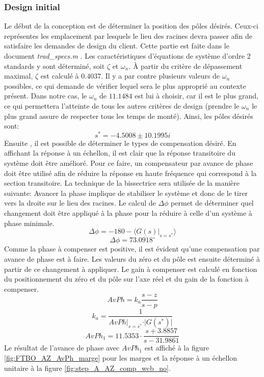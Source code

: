 \documentclass{udes_rapport} %
\begin{document}
\subsubsection{Design initial}
Le début de la conception est de déterminer la position des pôles désirés. Ceux-ci représentes les emplacement par lesquels le lieu des racines devra passer afin de satisfaire les demandes de design du client. Cette partie est faite dans le document \textit{trad\_specs.m} . Les caractéristiques d'équations de système d'ordre 2 standards y sont déterminé, soit $\zeta$ et $\omega _{n}$. À partir du critère de dépassement maximal, $\zeta$ est calculé à $0.4037$. Il y a par contre plusieurs valeurs de $\omega _{n}$ possibles, ce qui demande de vérifier lequel sera le plus approprié au contexte présent. Dans notre cas, le $\omega _{n}$ de $11.1484$ est lui à choisir, car il est le plus grand, ce qui permettera l'atteinte de tous les autres critères de design (prendre le $\omega _{n}$ le plus grand assure de respecter tous les temps de monté). Ainsi, les pôles désirés sont:
\[s^* = -4.5008\pm 10.1995i\]
Ensuite , il est possible de déterminer le types de compensation désiré. En affichant la réponse à un échellon, il est clair que la réponse transitoire du système doit être amélioré. Pour ce faire, un compensateur par avance de phase doit être utilisé afin de réduire la réponse en haute fréquence qui correspond à la section transitoire. La technique de la bissectrice sera utilisée de la manière suivante:
Avancer la phase implique de stabiliser le système et donc de le tirer vers la droite sur le lieu des racines. Le calcul de $\Delta \phi$ permet de déterminer quel changement doit être appliqué à la phase pour la réduire à celle d'un système à phase minimale.
\[\Delta \phi = -180 - \langle G(s)\vert_{s = s^*} \rangle\]
\[\Delta \phi = 73.0918^\circ \]
Comme la phase à compenser est positive, il est évident qu'une compensation par avance de phase est à faire. Les valeurs du zéro et du pôle est ensuite déterminé à partir de ce changement à appliquer. Le gain à compenser est calculé en fonction du positionnement du zéro et du pôle sur l'axe réel et du gain de la fonction à compenser.
\[AvPh = k_a\frac{s-z}{s-p}\]
\[k_a = \frac{1}{AvPh \vert_{s = s^*} \cdot \vert G(s^*)  \vert } \]
\[AvPh_1 = 11.5353 \cdot \frac{s+3.8857}{s-31.9861}\]
Le résultat de l'avance de phase avec $AvPh_1$ est affiché à la  figure \ref{fig:FTBO_AZ_AvPh_marge} pour les marges et la réponse à un échellon unitaire à la figure \ref{fig:step_A_AZ_comp_wcb_no}.
\end{document}
